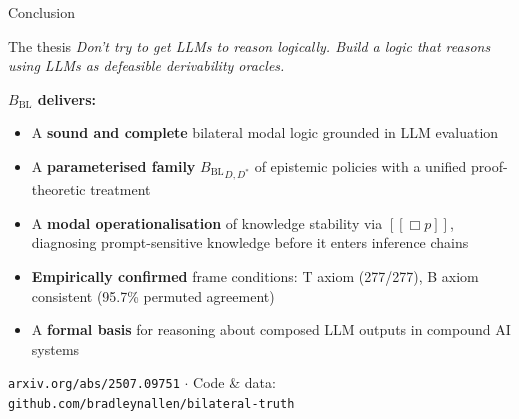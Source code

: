 \documentclass[aspectratio=169,9pt]{beamer}
\newcommand{\BBL}{{B_{\mathrm{BL}}}}
\begin{document}
\begin{frame}{Conclusion}

  \begin{block}{The thesis}
    \textit{Don't try to get LLMs to reason logically.
    Build a logic that reasons using LLMs as defeasible derivability oracles.}
  \end{block}

  \medskip

  \small\textbf{$\BBL$ delivers:}
  \begin{itemize}\setlength\itemsep{3pt}
    \item A \textbf{sound and complete} bilateral modal logic grounded in LLM evaluation
    \item A \textbf{parameterised family} $\BBL_{D,D^*}$ of epistemic policies
          with a unified proof-theoretic treatment
    \item A \textbf{modal operationalisation} of knowledge stability via $[\![\Box p]\!]$,
          diagnosing prompt-sensitive knowledge before it enters inference chains
    \item \textbf{Empirically confirmed} frame conditions: T axiom (277/277),
          B axiom consistent (95.7\% permuted agreement)
    \item A \textbf{formal basis} for reasoning about composed LLM outputs in
          compound AI systems
  \end{itemize}

  \medskip

  \begin{center}
    \small
    \texttt{arxiv.org/abs/2507.09751} \quad$\cdot$\quad
    Code \& data: \texttt{github.com/bradleynallen/bilateral-truth}
  \end{center}

\end{frame}
\end{document}
